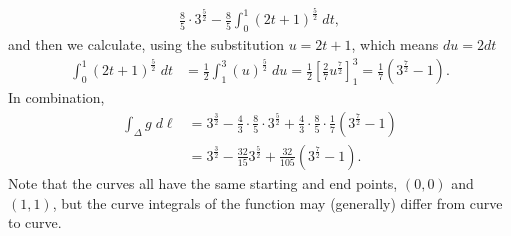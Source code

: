 \documentclass[11pt]{article}
\begin{document}
\begin{solution}
\begin{align*}
        \frac 8 5 \cdot 3^{\frac 5 2}
        -
        \frac 8 5 
        \int_0^1 \left( 2t + 1 \right)^{\frac 5 2} \;dt
        ,
    \end{align*}
    and then we calculate, using the substitution $u = 2t + 1$, which means $du = 2 dt$
    \begin{align*}
        \int_0^1 \left( 2t + 1 \right)^{\frac 5 2} \;dt
        &=
        \frac 1 2 
        \int_1^3 \left( u \right)^{\frac 5 2} \;du
        =
        \frac 1 2 
        \left[ \frac 2 7 u^{\frac 7 2}\right]_1^3
        =
        \frac 1 7 
        \left( 3^{\frac 7 2} - 1 \right)
        .
    \end{align*}
    In combination,
    \begin{align}
        \int_\Delta g \;d\ell 
        &= 
        3^{\frac 3 2} - \frac 4 3 \cdot \frac 8 5 \cdot 3^{\frac 5 2} + \frac 4 3 \cdot \frac 8 5 \cdot \frac 1 7 \left( 3^{\frac 7 2} - 1 \right)
        \\&=
        3^{\frac 3 2} - \frac{32}{15} 3^{\frac 5 2} + \frac{32}{105} \left( 3^{\frac 7 2} - 1 \right)
        .
    \end{align}
    Note that the curves all have the same starting and end points, $(0,0)$ and $(1,1)$, 
    but the curve integrals of the function may (generally) differ from curve to curve.  
\end{solution}
\end{document}
